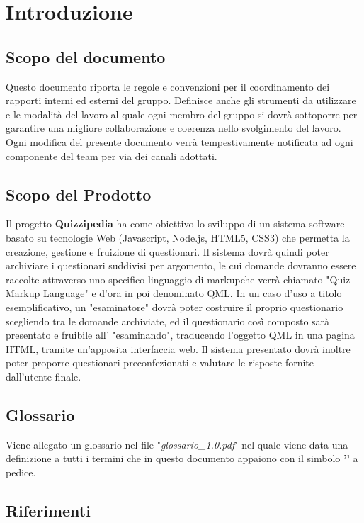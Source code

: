\documentclass[a4paper,11pt]{article}
\begin{document}
	\section{Introduzione}
	
		\subsection{Scopo del documento}
			Questo documento riporta le regole e convenzioni per il coordinamento dei rapporti interni ed esterni del gruppo. Definisce anche gli strumenti da utilizzare e le modalit\`a del lavoro al quale ogni membro del gruppo si dovr\`a sottoporre per garantire una migliore collaborazione e coerenza nello svolgimento del lavoro.\\
		Ogni modifica del presente documento  verr\`a tempestivamente notificata ad ogni componente del team per via dei canali adottati.
		\subsection{Scopo del Prodotto}
			Il progetto \textbf{Quizzipedia} ha come obiettivo lo sviluppo di un sistema software basato su tecnologie Web (Javascript\addglos, Node.js\addglos, HTML5\addglos, CSS3\addglos) che permetta la creazione, gestione e fruizione di questionari. Il sistema dovrà quindi poter archiviare i questionari suddivisi per argomento, le cui domande dovranno essere raccolte attraverso uno specifico linguaggio di markup\addglos che verrà chiamato "Quiz Markup Language" e d'ora in poi denominato QML\addglos. In un caso d'uso a titolo esemplificativo, un "esaminatore" dovrà poter costruire il proprio questionario scegliendo tra le domande archiviate, ed il questionario così composto sarà presentato e fruibile all' "esaminando", traducendo l'oggetto QML in una pagina HTML\addglos, tramite un'apposita interfaccia web. Il sistema presentato dovrà inoltre poter proporre questionari preconfezionati e valutare le risposte fornite dall'utente finale.	\\
		\subsection{Glossario}
			Viene allegato un glossario nel file "\textit{glossario\_1.0.pdf}" nel quale viene data una definizione a tutti i termini che in questo documento appaiono con il simbolo \textbf{'\addglos'}  a pedice.
		\subsection{Riferimenti}
\end{document}
